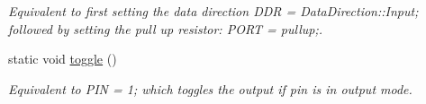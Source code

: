 \begin{DoxyCompactItemize}
\begin{DoxyCompactList}\small\item\em Equivalent to first setting the data direction {\ttfamily D\+DR = Data\+Direction\+::\+Input;} followed by setting the pull up resistor\+: {\ttfamily P\+O\+RT = pullup;}. \end{DoxyCompactList}\item 
static void \hyperlink{structports_1_1Pin_a3caf6009548ed46020910f36d2b0f4f9}{toggle} ()\hypertarget{structports_1_1Pin_a3caf6009548ed46020910f36d2b0f4f9}{}\label{structports_1_1Pin_a3caf6009548ed46020910f36d2b0f4f9}

\begin{DoxyCompactList}\small\item\em Equivalent to {\ttfamily P\+IN = 1;} which toggles the output if pin is in output mode. \end{DoxyCompactList}\end{DoxyCompactItemize}
